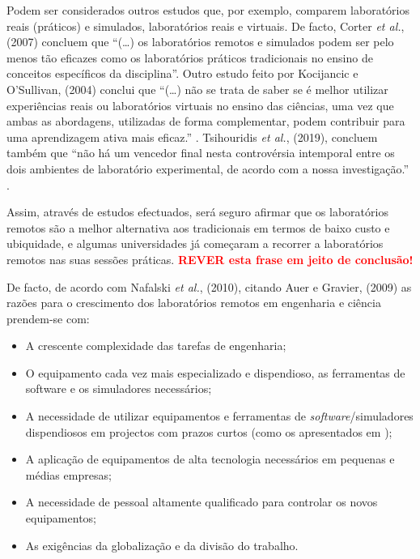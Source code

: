 Podem ser considerados outros estudos que, por exemplo, comparem laboratórios reais (práticos) e simulados, laboratórios reais e virtuais. De facto, Corter \textit{et al.}, (2007) concluem que ``(\ldots) os laboratórios remotos e simulados podem ser pelo menos tão eficazes como os laboratórios práticos tradicionais no ensino de conceitos específicos da disciplina''\cite{StudyRemoteHandsonSimulatedLabs}. Outro estudo feito por Kocijancic e O'Sullivan, (2004) conclui que ``(\ldots) não se trata de saber se é melhor utilizar experiências reais ou laboratórios virtuais no ensino das ciências, uma vez que ambas as abordagens, utilizadas de forma complementar, podem contribuir para uma aprendizagem ativa mais eficaz.'' \cite{RealorVirtualDilema}. Tsihouridis \textit{et al.}, (2019), concluem também que ``não há um vencedor final nesta controvérsia intemporal entre os dois ambientes de laboratório experimental, de acordo com a nossa investigação.'' \cite{controversy}.

Assim, através de estudos efectuados, será seguro afirmar que os laboratórios remotos são a melhor alternativa aos tradicionais em termos de baixo custo e ubiquidade, e algumas universidades já começaram a recorrer a laboratórios remotos nas suas sessões práticas\cite{VISIREngineeringPractices}. \textbf{\textcolor{red}{REVER esta frase em jeito de conclusão!}}

De facto, de acordo com Nafalski \textit{et al.}, (2010)\cite{ExperiencesRemoteLaboratories}, citando Auer e Gravier, (2009)\cite{ThemMnyfacesRemotLab} as razões para o crescimento dos laboratórios remotos em engenharia e ciência prendem-se com:

\begin{itemize}
    \item A crescente complexidade das tarefas de engenharia;
    \item O equipamento cada vez mais especializado e dispendioso, as ferramentas de software e os simuladores necessários;
    \item A necessidade de utilizar equipamentos e ferramentas de \textit{software}/simuladores dispendiosos em projectos com prazos curtos (como os apresentados em \cite{ExperiencesRemoteLab});
    \item A aplicação de equipamentos de alta tecnologia necessários em pequenas e médias empresas;
    \item A necessidade de pessoal altamente qualificado para controlar os novos equipamentos;
    \item As exigências da globalização e da divisão do trabalho.
\end{itemize}

